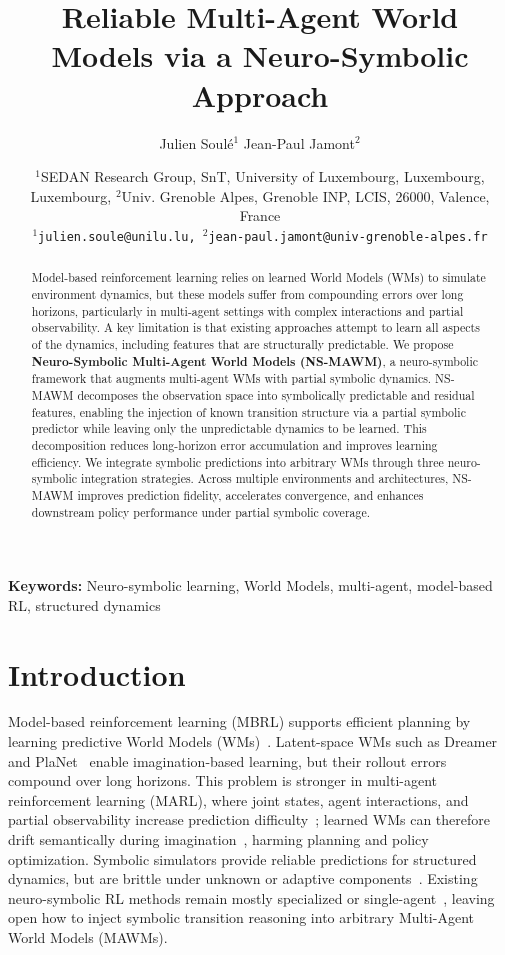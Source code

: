 \documentclass{article}
\title{Reliable Multi-Agent World Models via a Neuro-Symbolic Approach}
\author{Julien Soulé$^1$ \And Jean-Paul Jamont$^2$}
\date{$^1$SEDAN Research Group, SnT, University of Luxembourg, Luxembourg, Luxembourg, $^2$Univ. Grenoble Alpes, Grenoble INP, LCIS, 26000, Valence, France \\
\texttt{$^1$julien.soule@unilu.lu, $^2$jean-paul.jamont@univ-grenoble-alpes.fr}}
\theoremstyle{plain}
\theoremstyle{definition}
\theoremstyle{remark}
\begin{document}
\maketitle

\begin{abstract}
  Model-based reinforcement learning relies on learned World Models (WMs) to simulate environment dynamics, but these models suffer from compounding errors over long horizons, particularly in multi-agent settings with complex interactions and partial observability. A key limitation is that existing approaches attempt to learn all aspects of the dynamics, including features that are structurally predictable.
  We propose \textbf{Neuro-Symbolic Multi-Agent World Models (NS-MAWM)}, a neuro-symbolic framework that augments multi-agent WMs with partial symbolic dynamics. NS-MAWM decomposes the observation space into symbolically predictable and residual features, enabling the injection of known transition structure via a partial symbolic predictor while leaving only the unpredictable dynamics to be learned.
  This decomposition reduces long-horizon error accumulation and improves learning efficiency. We integrate symbolic predictions into arbitrary WMs through three neuro-symbolic integration strategies.
  Across multiple environments and architectures, NS-MAWM improves prediction fidelity, accelerates convergence, and enhances downstream policy performance under partial symbolic coverage.
\end{abstract}

\noindent\textbf{Keywords:} Neuro-symbolic learning, World Models, multi-agent, model-based RL, structured dynamics

\section{Introduction}

Model-based reinforcement learning (MBRL) supports efficient planning by learning predictive World Models (WMs)~\cite{hafner2018planet,hafner2019dreamer,janner2019mbpo,schrittwieser2020muzero}. Latent-space WMs such as Dreamer~\cite{hafner2019dreamer} and PlaNet~\cite{hafner2018planet} enable imagination-based learning, but their rollout errors compound over long horizons. This problem is stronger in multi-agent reinforcement learning (MARL), where joint states, agent interactions, and partial observability increase prediction difficulty~\cite{willemsen2021mambpo}; learned WMs can therefore drift semantically during imagination~\cite{hafner2019dreamer,janner2019mbpo}, harming planning and policy optimization. Symbolic simulators provide reliable predictions for structured dynamics, but are brittle under unknown or adaptive components~\cite{garcez2012neural,broda2002neural,bhuyan2024}. Existing neuro-symbolic RL methods remain mostly specialized or single-agent~\cite{shavlik1994,besold2015neural}, leaving open how to inject symbolic transition reasoning into arbitrary Multi-Agent World Models (MAWMs).
\end{document}
